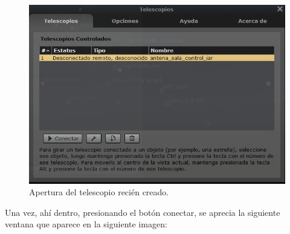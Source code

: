 \begin{figure}[ht!]
	\centering
	\includegraphics[scale=0.6]{rotador_stellarium} 
	\caption{Apertura del telescopio recién creado.}
	\label{fig:rotador_stellarium_conn}
\end{figure}
Una vez, ahí dentro, presionando el botón conectar, se aprecia la siguiente ventana que aparece en la siguiente imagen: %

